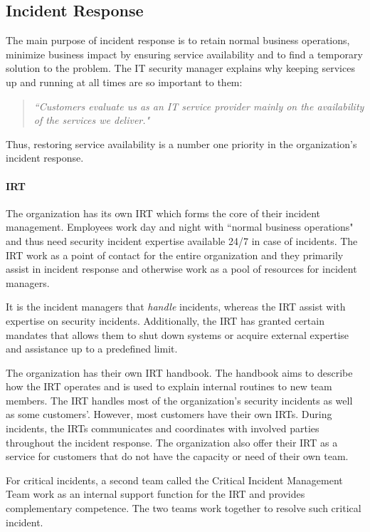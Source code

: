 \subsection{Incident Response}
The main purpose of incident response is to retain normal business operations, minimize business impact by ensuring service availability and to find a temporary solution to the problem. The IT security manager explains why keeping services up and running at all times are so important to them:
\begin{quote}
\textit{``Customers evaluate us as an IT service provider mainly on the availability of the services we deliver."}
\end{quote}
Thus, restoring service availability is a number one priority in the organization's incident response.

\paragraph{\acl{IRT}}
The organization has its own \ac{IRT} which forms the core of their incident management. Employees work day and night with ``normal business operations" and thus need security incident expertise available 24/7 in case of incidents. The \ac{IRT} work as a point of contact for the entire organization and they primarily assist in incident response and otherwise work as a pool of resources for incident managers. 

It is the incident managers that \emph{handle} incidents, whereas the \ac{IRT} assist with expertise on security incidents. Additionally, the \ac{IRT} has granted certain mandates that allows them to shut down systems or acquire external expertise and assistance up to a predefined limit.    

The organization has their own \ac{IRT} handbook. The handbook aims to describe how the \ac{IRT} operates and is used to explain internal routines to new team members. The \ac{IRT} handles most of the organization's security incidents as well as some customers'. However, most customers have their own \acp{IRT}. During incidents, the \acp{IRT} communicates and coordinates with involved parties throughout the incident response. The organization also offer their \ac{IRT} as a service for customers that do not have the capacity or need of their own team.

For critical incidents, a second team called the Critical Incident Management Team work as an internal support function for the \ac{IRT} and provides complementary competence. The two teams work together to resolve such critical incident. 

